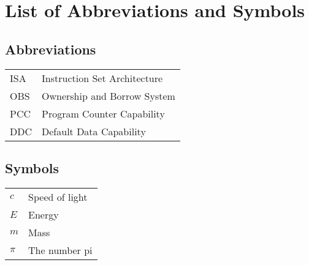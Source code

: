 \documentclass[master=ecws,masteroption=ss]{kulemt}
\begin{document}
\chapter{List of Abbreviations and Symbols}
\section*{Abbreviations}
\begin{flushleft}
  \renewcommand{\arraystretch}{1.1}
  \begin{tabularx}{\textwidth}{@{}p{12mm}X@{}}
    ISA   & Instruction Set Architecture \\
    OBS   & Ownership and Borrow System \\
    PCC   & Program Counter Capability \\
    DDC   & Default Data Capability \\
  \end{tabularx}
\end{flushleft}
\section*{Symbols}
\begin{flushleft}
  \renewcommand{\arraystretch}{1.1}
  \begin{tabularx}{\textwidth}{@{}p{12mm}X@{}}
    $c$   & Speed of light \\
    $E$   & Energy \\
    $m$   & Mass \\
    $\pi$ & The number pi \\
  \end{tabularx}
\end{flushleft}

\mainmatter










\appendixpage*          %
\appendix



\backmatter


\end{document}
